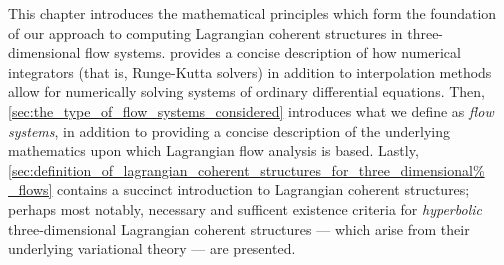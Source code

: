 This chapter introduces the mathematical principles which form the foundation
of our approach to computing Lagrangian coherent structures in
three-dimensional flow systems.
 provides a
concise description of how numerical integrators (that is, Runge-Kutta
solvers) in addition to interpolation methods allow for numerically solving
systems of ordinary differential equations. Then,
\cref{sec:the_type_of_flow_systems_considered} introduces what we define as
\emph{flow systems}, in addition to providing a concise description of the
underlying mathematics upon which Lagrangian flow analysis is based. Lastly,
\cref{sec:definition_of_lagrangian_coherent_structures_for_three_dimensional%
_flows} contains a succinct introduction to Lagrangian coherent structures;
perhaps most notably, necessary and sufficent existence criteria for
\emph{hyperbolic} three-dimensional Lagrangian coherent structures --- which
arise from their underlying variational theory --- are presented.
